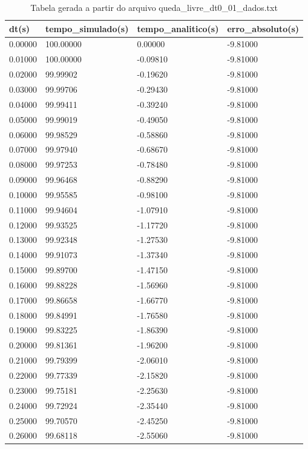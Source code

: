 \begin{table}
\caption{Tabela gerada a partir do arquivo queda_livre_dt0_01_dados.txt}
\label{tab:queda_livre_dt0_01_dados}
\begin{tabular}{llll}
\toprule
dt(s) & tempo_simulado(s) & tempo_analitico(s) & erro_absoluto(s) \\
\midrule
0.00000 & 100.00000 & 0.00000 & -9.81000 \\
0.01000 & 100.00000 & -0.09810 & -9.81000 \\
0.02000 & 99.99902 & -0.19620 & -9.81000 \\
0.03000 & 99.99706 & -0.29430 & -9.81000 \\
0.04000 & 99.99411 & -0.39240 & -9.81000 \\
0.05000 & 99.99019 & -0.49050 & -9.81000 \\
0.06000 & 99.98529 & -0.58860 & -9.81000 \\
0.07000 & 99.97940 & -0.68670 & -9.81000 \\
0.08000 & 99.97253 & -0.78480 & -9.81000 \\
0.09000 & 99.96468 & -0.88290 & -9.81000 \\
0.10000 & 99.95585 & -0.98100 & -9.81000 \\
0.11000 & 99.94604 & -1.07910 & -9.81000 \\
0.12000 & 99.93525 & -1.17720 & -9.81000 \\
0.13000 & 99.92348 & -1.27530 & -9.81000 \\
0.14000 & 99.91073 & -1.37340 & -9.81000 \\
0.15000 & 99.89700 & -1.47150 & -9.81000 \\
0.16000 & 99.88228 & -1.56960 & -9.81000 \\
0.17000 & 99.86658 & -1.66770 & -9.81000 \\
0.18000 & 99.84991 & -1.76580 & -9.81000 \\
0.19000 & 99.83225 & -1.86390 & -9.81000 \\
0.20000 & 99.81361 & -1.96200 & -9.81000 \\
0.21000 & 99.79399 & -2.06010 & -9.81000 \\
0.22000 & 99.77339 & -2.15820 & -9.81000 \\
0.23000 & 99.75181 & -2.25630 & -9.81000 \\
0.24000 & 99.72924 & -2.35440 & -9.81000 \\
0.25000 & 99.70570 & -2.45250 & -9.81000 \\
0.26000 & 99.68118 & -2.55060 & -9.81000 \\

\end{tabular}
\end{table}
